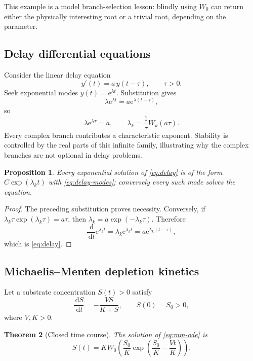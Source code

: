 \documentclass[11pt]{article}
\numberwithin{equation}{section}
\newtheorem{theorem}{Theorem}[section]
\newtheorem{proposition}[theorem]{Proposition}
\theoremstyle{definition}
\theoremstyle{remark}
\newcommand{\e}{\mathrm e}
\newcommand{\dd}{\,\mathrm d}
\begin{document}
This example is a model branch-selection lesson: blindly using $W_0$ can
return either the physically interesting root or a trivial root, depending on
the parameter.

\subsection{Delay differential equations}

Consider the linear delay equation
\begin{equation}
  y'(t)=a\,y(t-\tau),\qquad \tau>0.                    \label{eq:delay}
\end{equation}
Seek exponential modes $y(t)=\e^{\lambda t}$.  Substitution gives
\[
  \lambda\e^{\lambda t}=a\e^{\lambda(t-\tau)},
\]
so
\begin{equation}
  \lambda\e^{\lambda\tau}=a,
  \qquad
  \lambda_k=\frac1\tau W_k(a\tau).                   \label{eq:delay-modes}
\end{equation}
Every complex branch contributes a characteristic exponent.  Stability is
controlled by the real parts of this infinite family, illustrating why the
complex branches are not optional in delay problems.

\begin{proposition}
Every exponential solution of \eqref{eq:delay} is of the form
$C\exp(\lambda_k t)$ with \eqref{eq:delay-modes}; conversely every such mode
solves the equation.
\end{proposition}

\begin{proof}
The preceding substitution proves necessity.  Conversely, if
$\lambda_k\tau\exp(\lambda_k\tau)=a\tau$, then
$\lambda_k=a\exp(-\lambda_k\tau)$.  Therefore
\[
 \frac{\dd}{\dd t}\e^{\lambda_k t}
 =\lambda_k\e^{\lambda_k t}
 =a\e^{\lambda_k(t-\tau)},
\]
which is \eqref{eq:delay}.
\end{proof}

\subsection{Michaelis--Menten depletion kinetics}

Let a substrate concentration $S(t)>0$ satisfy
\begin{equation}
  \frac{\dd S}{\dd t}=-\frac{V S}{K+S},
  \qquad S(0)=S_0>0,                                  \label{eq:mm-ode}
\end{equation}
where $V,K>0$.

\begin{theorem}[Closed time course]
\label{thm:mm}
The solution of \eqref{eq:mm-ode} is
\begin{equation}
 S(t)=K W_0\!\left(
   \frac{S_0}{K}\exp\!\left(\frac{S_0}{K}-\frac{Vt}{K}\right)
 \right).                                              \label{eq:mm-solution}
\end{equation}
\end{theorem}
\end{document}
